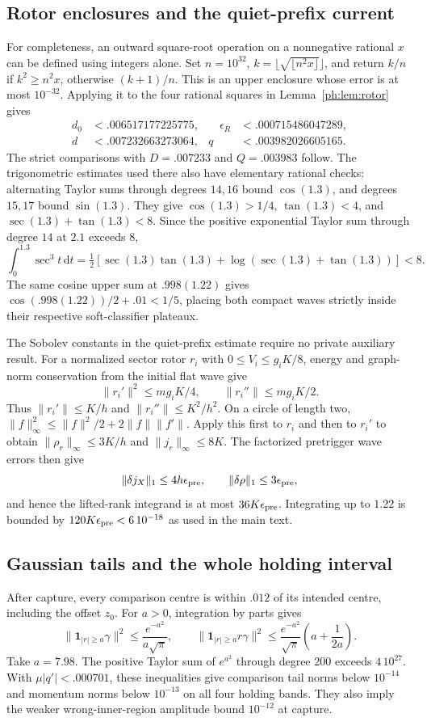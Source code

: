 \documentclass[11pt]{article}
\theoremstyle{definition}\newtheorem{definition}[theorem]{Definition}
\theoremstyle{remark}\newtheorem{remark}[theorem]{Remark}
\newcommand{\one}{\mathbf1}\newcommand{\R}{\mathbb R}\newcommand{\T}{\mathbb T}
\newcommand{\dd}{\,\mathrm d}\newcommand{\Imv}{\operatorname{Im}}\newcommand{\ii}{\mathrm i}
\begin{document}
\subsection{Rotor enclosures and the quiet-prefix current}
For completeness, an outward square-root operation on a nonnegative
rational $x$ can be defined using integers alone. Set $n=10^{32}$,
$k=\lfloor\sqrt{\lfloor n^2x\rfloor}\rfloor$, and return $k/n$ if
$k^2\ge n^2x$, otherwise $(k+1)/n$. This is an upper enclosure whose
error is at most $10^{-32}$. Applying it to the four rational squares
in Lemma~\ref{ph:lem:rotor} gives
\[
\begin{aligned}
 d_0&<.006517177225775,&\quad \epsilon_R&<.000715486047289,\\
 d&<.007232663273064,&q&<.003982026605165.
\end{aligned}
\]
The strict comparisons with $D=.007233$ and $Q=.003983$ follow.
The trigonometric estimates used there also have elementary rational
checks: alternating Taylor sums through degrees $14,16$ bound
$\cos(1.3)$, and degrees $15,17$ bound $\sin(1.3)$.
They give $\cos(1.3)>1/4$, $\tan(1.3)<4$, and
$\sec(1.3)+\tan(1.3)<8$. Since the positive exponential Taylor
sum through degree $14$ at $2.1$ exceeds $8$,
\[
 \int_0^{1.3}\sec^3 t\dd t
 =\tfrac12[\sec(1.3)\tan(1.3)+
                 \log(\sec(1.3)+\tan(1.3))]<8.
\]
The same cosine upper sum at $.998(1.22)$ gives
$\cos(.998(1.22))/2+.01<1/5$, placing both compact waves
strictly inside their respective soft-classifier plateaux.

The Sobolev constants in the quiet-prefix estimate require no private
auxiliary result. For a normalized sector rotor $r_i$ with
$0\le V_i\le g_iK/8$, energy and graph-norm conservation from the
initial flat wave give
\[
 \|r_i'\|^2\le mg_iK/4,\qquad
 \|r_i''\|\le mg_iK/2.
\]
Thus $\|r_i'\|\le K/h$ and $\|r_i''\|\le K^2/h^2$.
On a circle of length two,
$\|f\|_\infty^2\le\|f\|^2/2+2\|f\|\|f'\|$.
Apply this first to $r_i$ and then to $r_i'$ to obtain
$\|\rho_r\|_\infty\le3K/h$ and $\|j_r\|_\infty\le8K$.
The factorized pretrigger wave errors then give
\[
 \|\delta j_X\|_1\le4h\epsilon_{\rm pre},\qquad
 \|\delta\rho\|_1\le3\epsilon_{\rm pre},
\]
and hence the lifted-rank integrand is at most
$36K\epsilon_{\rm pre}$. Integrating up to $1.22$ is bounded by
$120K\epsilon_{\rm pre}<6\,10^{-18}$ as used in the main text.

\subsection{Gaussian tails and the whole holding interval}
After capture, every comparison centre is within $.012$ of its intended
centre, including the offset $z_0$. For $a>0$, integration by parts gives
\[
 \|\one_{|r|\ge a}\gamma\|^2\le
 \frac{e^{-a^2}}{a\sqrt\pi},\qquad
 \|\one_{|r|\ge a}r\gamma\|^2\le
 \frac{e^{-a^2}}{\sqrt\pi}\left(a+\frac1{2a}\right).
\]
Take $a=7.98$. The positive Taylor sum of $e^{a^2}$ through degree
$200$ exceeds $4\,10^{27}$. With $\mu|q'|<.000701$, these inequalities
give comparison tail norms below $10^{-14}$ and momentum norms below
$10^{-13}$ on all four holding bands. They also imply the weaker
wrong-inner-region amplitude bound $10^{-12}$ at capture.
\end{document}
